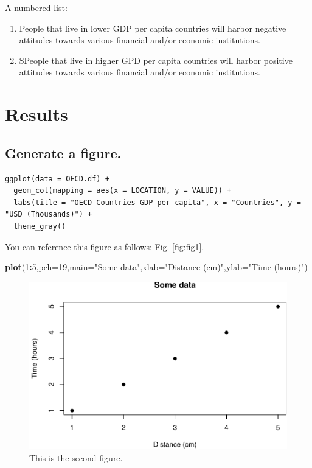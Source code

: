 \documentclass[12pt,halfline,a4paper,]{ouparticle}
\newenvironment{Shaded}{\begin{snugshade}}{\end{snugshade}}
\newcommand{\DataTypeTok}[1]{\textcolor[rgb]{0.13,0.29,0.53}{#1}}
\newcommand{\DecValTok}[1]{\textcolor[rgb]{0.00,0.00,0.81}{#1}}
\newcommand{\KeywordTok}[1]{\textcolor[rgb]{0.13,0.29,0.53}{\textbf{#1}}}
\newcommand{\NormalTok}[1]{#1}
\newcommand{\OperatorTok}[1]{\textcolor[rgb]{0.81,0.36,0.00}{\textbf{#1}}}
\newcommand{\StringTok}[1]{\textcolor[rgb]{0.31,0.60,0.02}{#1}}
\providecommand{\tightlist}{%
  \setlength{\itemsep}{0pt}\setlength{\parskip}{0pt}}
\begin{document}
A numbered list:

\begin{enumerate}
\def\labelenumi{\arabic{enumi})}
\tightlist
\item
  People that live in lower GDP per capita countries will harbor
  negative attitudes towards various financial and/or economic
  institutions.
\item
  SPeople that live in higher GPD per capita countries will harbor
  positive attitudes towards various financial and/or economic
  institutions.
\end{enumerate}

\hypertarget{results}{%
\section{Results}\label{results}}

\hypertarget{generate-a-figure.}{%
\subsection{Generate a figure.}\label{generate-a-figure.}}

\begin{verbatim}
ggplot(data = OECD.df) + 
  geom_col(mapping = aes(x = LOCATION, y = VALUE)) +
  labs(title = "OECD Countries GDP per capita", x = "Countries", y = "USD (Thousands)") +
  theme_gray()
\end{verbatim}

You can reference this figure as follows: Fig. \ref{fig:fig1}.

\begin{Shaded}
\begin{Highlighting}[]
\KeywordTok{plot}\NormalTok{(}\DecValTok{1}\OperatorTok{:}\DecValTok{5}\NormalTok{,}\DataTypeTok{pch=}\DecValTok{19}\NormalTok{,}\DataTypeTok{main=}\StringTok{"Some data"}\NormalTok{,}\DataTypeTok{xlab=}\StringTok{"Distance (cm)"}\NormalTok{,}\DataTypeTok{ylab=}\StringTok{"Time (hours)"}\NormalTok{)}
\end{Highlighting}
\end{Shaded}

\begin{figure}[p]
\includegraphics[width=1\linewidth]{Markdown-v3_files/figure-latex/fig2-1} \caption{This is the second figure.}\label{fig:fig2}
\end{figure}
\end{document}
